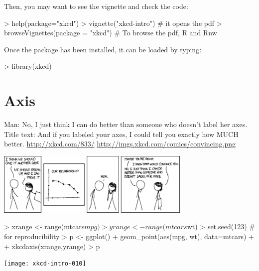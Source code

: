 \documentclass[10pt]{article}
\begin{document}
Then, you may want to see the vignette and check the code:
\begin{Schunk}
\begin{Sinput}
> help(package="xkcd")
> vignette("xkcd-intro") # it opens the pdf
> browseVignettes(package = "xkcd") # To browse the pdf, R and Rnw
\end{Sinput}
\end{Schunk}

Once the package has been installed, it can be loaded by typing:

\begin{Schunk}
\begin{Sinput}
> library(xkcd)
\end{Sinput}
\end{Schunk}


\section{Axis}




\begin{center}
    Man: No, I just think I can do better than someone who doesn't label her axes. Title text: And if you labeled your axes, I could tell you exactly how MUCH better.  {\tiny
    \url{http://xkcd.com/833/}
    \url{http://imgs.xkcd.com/comics/convincing.png}}
    
    \includegraphics[width=0.7\textwidth]{convincing}

   
\end{center}






\begin{center}
\begin{Schunk}
\begin{Sinput}
> xrange <- range(mtcars$mpg)
> yrange <- range(mtcars$wt)
> set.seed(123) # for reproducibility
> p <- ggplot() + geom_point(aes(mpg, wt), data=mtcars) + 
+   xkcdaxis(xrange,yrange)
> p
\end{Sinput}
\end{Schunk}
\texttt{[image: xkcd-intro-010]}
\end{center}
\end{document}
